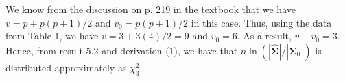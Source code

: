 \documentclass[12pt]{article}\usepackage[]{graphicx}\usepackage[]{color}
\newcommand{\vct}{\mathbf}
\begin{document}
We know from the discussion on p. 219 in the textbook that we have $v = p + p(p+1)/2$ and $v_0 = p(p+1)/2$ in this case. Thus, using the data from Table 1, we have $v = 3 + 3(4)/2 = 9$ and $v_0 = 6$. As a result, $v - v_0 = 3$.\\

Hence, from result 5.2 and derivation (1), we have that $n \ln{(|\hat{\vct{\Sigma}}|/|\hat{\vct{\Sigma}}_0|)}$ is distributed approximately as $\chi^2_{3}$.
\end{document}
